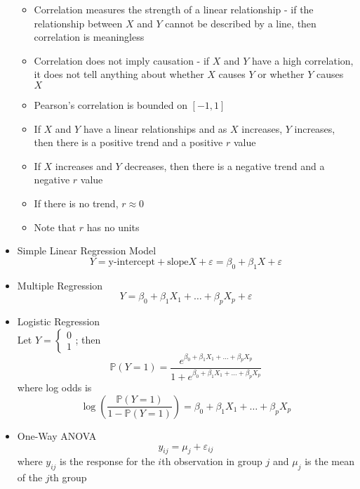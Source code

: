 \documentclass[12pt]{article}
\begin{document}
\begin{itemize}
\begin{itemize}
\item Correlation measures the strength of a linear relationship - if the relationship between $X$ and $Y$ cannot be described by a line, then correlation is meaningless
\item Correlation does not imply causation - if $X$ and $Y$ have a high correlation, it does not tell anything about whether $X$ causes $Y$ or whether $Y$ causes $X$ 
\item Pearson's correlation is bounded on $[-1,1]$
\item If $X$ and $Y$ have a linear relationships and as $X$ increases, $Y$ increases, then there is a positive trend and a positive $r$ value
\item If $X$ increases and $Y$ decreases, then there is a negative trend and a negative $r$ value 
\item If there is no trend, $r \approx 0$ 
\item Note that $r$ has no units \end{itemize} 
\item Simple Linear Regression Model $$ Y = \text{y-intercept} + \text{slope}X + \varepsilon = \beta_0 + \beta_1X + \varepsilon $$ 
\item Multiple Regression $$ Y = \beta_0 + \beta_1X_1 + \dots + \beta_pX_p + \varepsilon $$ 
\item Logistic Regression \\
Let $Y = \begin{cases} 0 \\ 1 \end{cases} $; 
then $$ \mathbb{P}(Y = 1) = \frac{e^{\beta_0 + \beta_1X_1 + \dots + \beta_pX_p}}{1 + e^{\beta_0 + \beta_1X_1 + \dots + \beta_pX_p}} $$ where log odds is $$ \log \left( \frac{\mathbb{P}(Y = 1)}{1 - \mathbb{P}(Y=1)}\right) = \beta_0 + \beta_1X_1 + \dots + \beta_pX_p $$ 
\item One-Way ANOVA $$y_{ij} = \mu_j + \varepsilon_{ij} $$ where $y_{ij}$ is the response for the $i$th observation in group $j$ and $\mu_j$ is the mean of the $j$th group 
\end{itemize}
\end{document}
